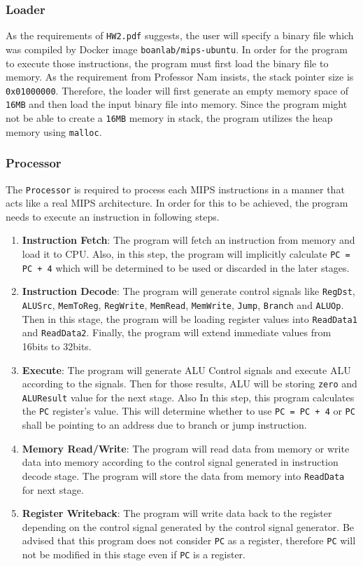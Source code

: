 \documentclass{homework}
\begin{document}
\subsubsection{Loader}
As the requirements of \texttt{HW2.pdf} suggests, the user will specify a binary file which was compiled by Docker image \texttt{boanlab/mips-ubuntu}. In order for the program to execute those instructions, the program must first load the binary file to memory. As the requirement from Professor Nam insists, the stack pointer size is \texttt{0x01000000}. Therefore, the loader will first generate an empty memory space of \texttt{16MB} and then load the input binary file into memory. Since the program might not be able to create a \texttt{16MB} memory in stack, the program utilizes the heap memory using \texttt{malloc}.

\subsubsection{Processor}
The \texttt{Processor} is required to process each MIPS instructions in a manner that acts like a real MIPS architecture. In order for this to be achieved, the program needs to execute an instruction in following steps.
\begin{enumerate}
    \item \textbf{Instruction Fetch}: The program will fetch an instruction from memory and load it to CPU. Also, in this step, the program will implicitly calculate \texttt{PC = PC + 4} which will be determined to be used or discarded in the later stages.
    \item \textbf{Instruction Decode}: The program will generate control signals like \texttt{RegDst}, \texttt{ALUSrc}, \texttt{MemToReg}, \texttt{RegWrite}, \texttt{MemRead}, \texttt{MemWrite}, \texttt{Jump}, \texttt{Branch} and \texttt{ALUOp}. Then in this stage, the program will be loading register values into \texttt{ReadData1} and \texttt{ReadData2}. Finally, the program will extend immediate values from 16bits to 32bits. 
    \item \textbf{Execute}: The program will generate ALU Control signals and execute ALU according to the signals. Then for those results, ALU will be storing \texttt{zero} and \texttt{ALUResult} value for the next stage. Also In this step, this program calculates the \texttt{PC} register's value. This will determine whether to use \texttt{PC = PC + 4} or \texttt{PC} shall be pointing to an address due to branch or jump instruction.
    \item \textbf{Memory Read/Write}: The program will read data from memory or write data into memory according to the control signal generated in instruction decode stage. The program will store the data from memory into \texttt{ReadData} for next stage.
    \item \textbf{Register Writeback}: The program will write data back to the register depending on the control signal generated by the control signal generator. Be advised that this program does not consider \texttt{PC} as a register, therefore \texttt{PC} will not be modified in this stage even if \texttt{PC} is a register.
\end{enumerate}
\end{document}
